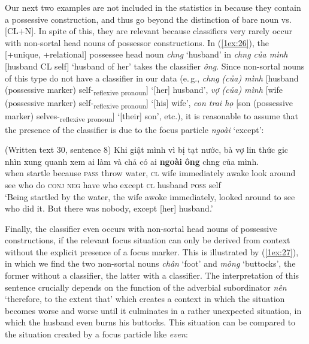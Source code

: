 \documentclass[output=paper]{langsci/langscibook}
\begin{document}
{
Our next two examples are not included in the statistics in  because they contain a possessive construction, and thus go beyond the distinction of bare noun vs. [CL+N]. In spite of this, they are relevant because classifiers very rarely occur with non-sortal head nouns of possessor constructions. In (\ref{1ex:26}), the [+unique, +relational] possessee head noun {\emph{ch{\daob}ng}} `husband' in {\emph{ch{\daob}ng của mình}} [husband CL self] `husband of her' takes the classifier {\emph{ông}}. Since non-sortal nouns of this type do not have a classifier in our data (e.\,g., {\emph{ch{\daob}ng (của) mình}} [husband (possessive marker) self-\textsubscript{reflexive pronoun}] `[her] husband', {\emph{vợ (của) mình}} [wife (possessive marker) self-\textsubscript{reflexive pronoun}] `[his] wife', {\emph{con trai họ}} [son (possessive marker) selves-\textsubscript{reflexive pronoun}] `[their] son', etc.), it is reasonable to assume that the presence of the classifier is due to the focus particle {\emph{ngoài}} `except':
}

\begin{exe}
\ex\label{1ex:26}
(Written text 30, sentence 8)
\exi{}
\gll Khi    {giật mình}  vì            bị        tạt      nước,  bà  vợ    li{\daeb}n                {thức gi{\daa}c}  nhìn {xung quanh} xem  ai     làm  và        chả  có      ai    {\textbf{ngoài}}   {\textbf{ông}} ch{\daob}ng     của     mình. \\
when startle        because {\textsc{pass}}  throw water, {\textsc{cl}} wife immediately  awake       look  around         see   who do    {\textsc{conj}} {\textsc{neg}} have who except  {\textsc{cl}}  husband {\textsc{poss}}  self \\
\glt `Being startled by the water, the wife awoke immediately, looked around to see who did it. But there was nobody, except [her] husband.'
\end{exe}

Finally, the classifier even occurs with non-sortal head nouns of possessive constructions, if the relevant focus situation can only be derived from context without the explicit presence of a focus marker. This is illustrated by (\ref{1ex:27}), in which we find the two non-sortal nouns {\emph{chân}} `foot' and {\emph{mông}} `buttocks', the former without a classifier, the latter with a classifier. The interpretation of this sentence crucially depends on the function of the adverbial subordinator {\emph{nên}} `therefore, to the extent that' which creates a context in which the situation becomes worse and worse until it culminates in a rather unexpected situation, in which the husband even burns his buttocks. This situation can be compared to the situation created by a focus particle like {\emph{even}}:
\end{document}
